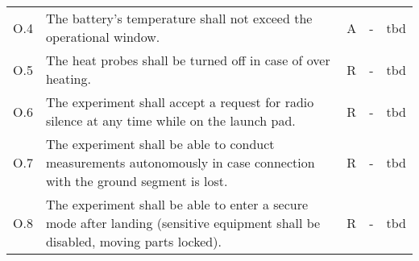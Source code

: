 \documentclass[11pt]{scrartcl}
\begin{document}
\begin{center}
\begin{longtable}{| p{} | p{} | p{} | p{} | p{} |}
		\hline
		O.4 & The battery’s temperature shall not exceed the operational window. & A & - & tbd \\
		O.5 & The heat probes shall be turned off in case of over heating. & R & - & tbd \\
		O.6 & The experiment shall accept a request for radio silence at any time while on the launch pad. & R & - & tbd \\
		O.7 & The experiment shall be able to conduct measurements autonomously in case connection with the ground segment is lost. & R & - & tbd \\
		O.8 & The experiment shall be able to enter a secure mode after landing (sensitive equipment shall be disabled, moving parts locked). & R & - & tbd \\
		\hline
	\end{longtable}
\end{center}
 
\end{document}
